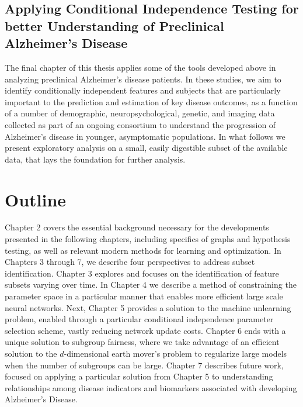 {\color{red}
\subsection{Applying Conditional Independence Testing for better Understanding of Preclinical Alzheimer's Disease}

The final chapter of this thesis applies some of the tools developed above in analyzing preclinical Alzheimer's disease patients. 
In these studies, 
we aim to identify conditionally independent features and subjects that are particularly important to the prediction and estimation of
key disease outcomes,
as a function of a number 
of demographic, neuropsychological,
genetic,
and imaging data collected as 
part of an ongoing consortium 
to understand the progression
of Alzheimer's disease in younger, 
asymptomatic populations.
In what follows we present
exploratory analysis
on a small, easily 
digestible subset of the available data,
that lays the foundation for
further analysis.
}

\section{Outline}
Chapter 2 covers the essential background necessary for the developments presented in the following chapters, including specifics of graphs and hypothesis testing, as well as relevant modern methods for learning and optimization.
In Chapters 3 through 7, we describe four perspectives to address subset identification.
Chapter 3 explores and focuses on the identification of feature subsets varying over time.
In Chapter 4 we describe a method of constraining the parameter space in a particular manner
that enables more efficient large scale neural networks.
Next, Chapter 5 provides a solution to the machine unlearning problem,
enabled through a particular conditional independence parameter selection scheme, vastly reducing network update costs.
Chapter 6 ends with a unique solution to subgroup fairness, 
where we take advantage of an efficient solution to
the $d$-dimensional earth mover's problem
to regularize large models when the number of subgroups can be large.
{\color{red} Chapter 7 describes future work, focused on applying a particular solution from Chapter 5 to understanding relationships among
disease indicators and biomarkers associated with developing Alzheimer's Disease.}



